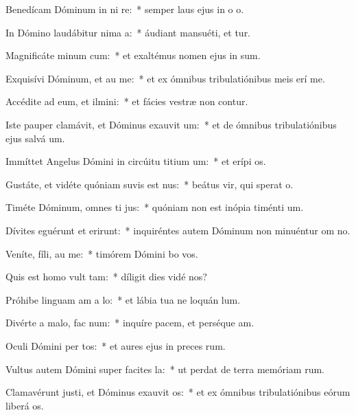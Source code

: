 \item Benedícam Dóminum in ni re:~* semper laus ejus in o o.
\item In Dómino laudábitur nima a:~* áudiant mansuéti, et tur.
\item Magnificáte minum cum:~* et exaltémus nomen ejus in sum.
\item Exquisívi Dóminum, et au me:~* et ex ómnibus tribulatiónibus meis erí me.
\item Accédite ad eum, et ilmini:~* et fácies vestræ non contur.
\item Iste pauper clamávit, et Dóminus exauvit um:~* et de ómnibus tribulatiónibus ejus salvá um.
\item Immíttet Angelus Dómini in circúitu titium um:~* et erípi os.
\item Gustáte, et vidéte quóniam suvis est nus:~* beátus vir, qui sperat  o.
\item Timéte Dóminum, omnes ti jus:~* quóniam non est inópia timénti um.
\item Dívites eguérunt et erirunt:~* inquiréntes autem Dóminum non minuéntur om no.
\item Veníte, fíli, au me:~* timórem Dómini bo vos.
\item Quis est homo  vult tam:~* díligit dies vidé nos?
\item Próhibe linguam am a lo:~* et lábia tua ne loquán lum.
\item Divérte a malo,  fac num:~* inquíre pacem, et perséque am.
\item Oculi Dómini per tos:~* et aures ejus in preces rum.
\item Vultus autem Dómini super facites la:~* ut perdat de terra memóriam rum.
\item Clamavérunt justi, et Dóminus exauvit os:~* et ex ómnibus tribulatiónibus eórum liberá os.
